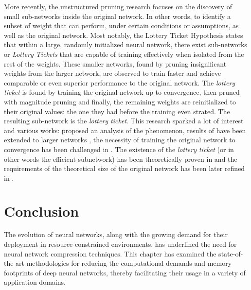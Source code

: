  More recently, the unstructured pruning research focuses on the discovery of
 small sub-networks inside the original network. In other words, to identify a
 subset of weight that can perform, under certain conditions or assumptions, as
 well as the original network. Most notably, the Lottery Ticket Hypothesis
 \cite{DBLP:conf/iclr/FrankleC19} states that within a large, randomly
 initialized neural network, there exist sub-networks or \emph{Lottery Tickets}
 that are capable of training effectively when isolated from the rest of the
 weights. These smaller networks, found by pruning insignificant weights from
 the larger network, are observed to train faster and achieve comparable or even
 superior performance to the original network. The \emph{lottery ticket} is
 found by training the original network up to convergence, then pruned with
 magnitude pruning and finally, the remaining weights are reinitialized to their
 original values: the one they had before the training even strated. The
 resulting sub-network is the \emph{lottery ticket}. This research sparked a
 lot of interest and various works: \cite{DBLP:conf/nips/ZhouLLY19} proposed an
 analysis of the phenomenon, results of \cite{DBLP:conf/iclr/FrankleC19} have
 been extended to larger networks \cite{DBLP:journals/corr/abs-1903-01611}, the
 necessity of training the original network to convergence has been challenged
 in \cite{DBLP:conf/iclr/LiuSZHD19}. The existence of the \emph{lottery ticket}
 (or in other words the efficient subnetwork) has been theoretically proven in
 \cite{DBLP:conf/icml/MalachYSS20} and the requirements of the theoretical size
 of the original network has been later refined in
 \cite{DBLP:conf/nips/PensiaRNVP20,DBLP:conf/nips/OrseauHR20}.\\


\section{Conclusion}



The evolution of neural networks, along with the growing demand for their
deployment in resource-constrained environments, has underlined the need for
neural network compression techniques. This chapter has examined the
state-of-the-art methodologies for reducing the computational demands and memory
footprints of deep neural networks, thereby facilitating their usage in a
variety of application domains.\\

